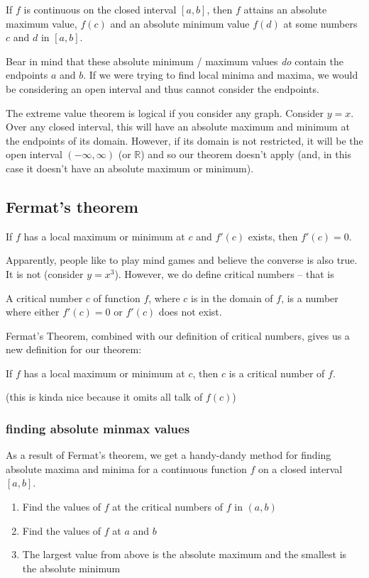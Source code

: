 \documentclass[10pt,a4paper]{report}
\begin{document}
If $f$ is continuous on the closed interval $[a, b]$, then $f$ attains an absolute maximum value, $f(c)$ and an absolute minimum value $f(d)$ at some numbers $c$ and $d$ in $[a, b]$.

Bear in mind that these absolute minimum / maximum values \emph{do} contain the endpoints $a$ and $b$. If we were trying to find local minima and maxima, we would be considering an open interval and thus cannot consider the endpoints.	

The extreme value theorem is logical if you consider any graph. Consider $y = x$. Over any closed interval, this will have an absolute maximum and minimum at the endpoints of its domain. However, if its domain is not restricted, it will be the open interval $(-\infty, \infty)$ (or $\mathbb{R}$) and so our theorem doesn't apply (and, in this case it doesn't have an absolute maximum or minimum).

\subsection{Fermat's theorem}

If $f$ has a local maximum or minimum at $c$ and $f'(c)$ exists, then $f'(c) = 0$.

Apparently, people like to play mind games and believe the converse is also true. It is not (consider $y = x^3$). However, we do define critical numbers -- that is

A critical number $c$ of function $f$, where $c$ is in the domain of $f$, is a number where either $f'(c) = 0$ or $f'(c)$ does not exist.

Fermat's Theorem, combined with our definition of critical numbers, gives us a new definition for our theorem:

If $f$ has a local maximum or minimum at $c$, then $c$ is a critical number of $f$.

(this is kinda nice because it omits all talk of $f(c)$)

\subsubsection{finding absolute minmax values}

As a result of Fermat's theorem, we get a handy-dandy method for finding absolute maxima and minima for a continuous function $f$ on a closed interval $[a, b]$.

\begin{enumerate}
	\item Find the values of $f$ at the critical numbers of $f$ in $(a, b)$
	\item Find the values of $f$ at $a$ and $b$
	\item The largest value from above is the absolute maximum and the smallest is the absolute minimum
\end{enumerate}
\end{document}
